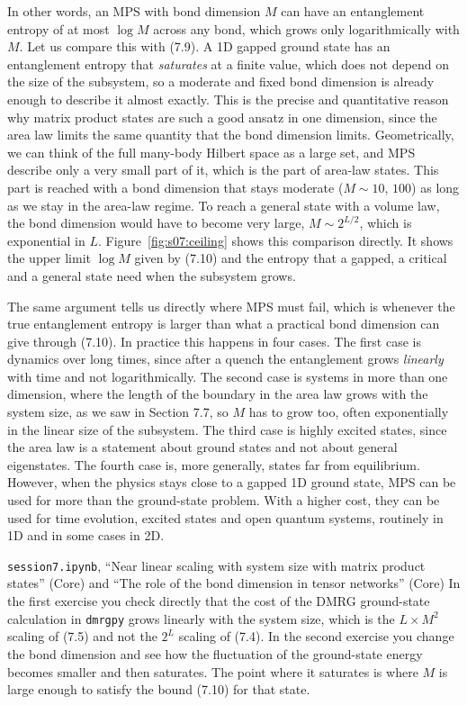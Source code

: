 In other words, an MPS with bond dimension $M$ can have an entanglement entropy of at most $\log M$
across any bond, which grows only logarithmically with $M$. Let us compare this with (7.9). A 1D
gapped ground state has an entanglement entropy that \emph{saturates} at a finite value, which does
not depend on the size of the subsystem, so a moderate and fixed bond dimension is already enough to
describe it almost exactly. This is the precise and quantitative reason why matrix product states are
such a good ansatz in one dimension, since the area law limits the same quantity that the bond
dimension limits. Geometrically, we can think of the full many-body Hilbert space as a large set, and
MPS describe only a very small part of it, which is the part of area-law states. This part is reached
with a bond dimension that stays moderate ($M \sim 10$, $100$) as long as we stay in the area-law
regime. To reach a general state with a volume law, the bond dimension would have to become very
large, $M \sim 2^{L/2}$, which is exponential in $L$. Figure~\ref{fig:s07:ceiling} shows this comparison directly. It
shows the upper limit
$\log M$ given by (7.10) and the entropy that a gapped, a critical and a general state
need when the subsystem grows.



The same argument tells us directly where MPS must fail, which is whenever the true entanglement
entropy is larger than what a practical bond dimension can give through (7.10). In practice this
happens in four cases. The first case is dynamics over long times, since after a quench the
entanglement grows \emph{linearly} with time and not logarithmically. The second case is systems in
more than one dimension, where the length of the boundary in the area law grows with the system size,
as we saw in Section 7.7, so $M$ has to grow too, often exponentially in the linear size of the
subsystem. The third case is highly excited states, since the area law is a statement about ground
states and not about general eigenstates. The fourth case is, more generally, states far from
equilibrium. However, when the physics stays close to a gapped 1D ground state, MPS can be used for
more than the ground-state problem. With a higher cost, they can be used for time evolution, excited
states and open quantum systems, routinely in 1D and in some cases in 2D.

\begin{notebookbox}{\texttt{session7.ipynb}, ``Near linear scaling with system size with matrix product states'' (Core) and ``The role of the bond dimension in tensor networks'' (Core)}
In the first exercise you check directly that the cost of the DMRG ground-state calculation in
\texttt{dmrgpy} grows linearly with the system size, which is the $L\times M^2$ scaling of (7.5) and
not the $2^L$ scaling of (7.4). In the second exercise you change the bond dimension and see how the
fluctuation of the ground-state energy becomes smaller and then saturates. The point where it
saturates is where $M$ is large enough to satisfy the bound (7.10) for that state.
\end{notebookbox}

